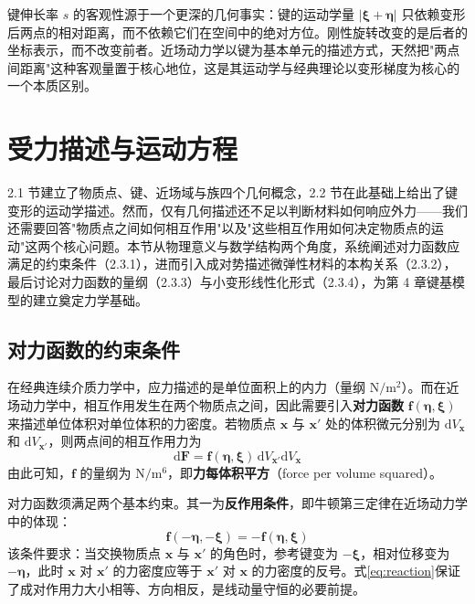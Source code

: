 \begin{remark}
  键伸长率 $s$ 的客观性源于一个更深的几何事实：键的运动学量 $|\boldsymbol{\xi}+\boldsymbol{\eta}|$ 只依赖变形后两点的相对距离，而不依赖它们在空间中的绝对方位。刚性旋转改变的是后者的坐标表示，而不改变前者。近场动力学以键为基本单元的描述方式，天然把"两点间距离"这种客观量置于核心地位，这是其运动学与经典理论以变形梯度为核心的一个本质区别。
\end{remark}

\section{受力描述与运动方程}

2.1 节建立了物质点、键、近场域与族四个几何概念，2.2 节在此基础上给出了键变形的运动学描述。然而，仅有几何描述还不足以判断材料如何响应外力——我们还需要回答"物质点之间如何相互作用"以及"这些相互作用如何决定物质点的运动"这两个核心问题。本节从物理意义与数学结构两个角度，系统阐述对力函数应满足的约束条件（2.3.1），进而引入成对势描述微弹性材料的本构关系（2.3.2），最后讨论对力函数的量纲（2.3.3）与小变形线性化形式（2.3.4），为第 4 章键基模型的建立奠定力学基础。

\subsection{对力函数的约束条件}

在经典连续介质力学中，应力描述的是单位面积上的内力（量纲 $\mathrm{N}/\mathrm{m}^{2}$）。而在近场动力学中，相互作用发生在两个物质点之间，因此需要引入\textbf{对力函数} $\mathbf{f}(\boldsymbol{\eta},\boldsymbol{\xi})$ 来描述单位体积对单位体积的力密度。若物质点 $\mathbf{x}$ 与 $\mathbf{x}'$ 处的体积微元分别为 $\mathrm{d}V_{\mathbf{x}}$ 和 $\mathrm{d}V_{\mathbf{x}'}$，则两点间的相互作用力为
\begin{equation}
  \mathrm{d}\mathbf{F}=\mathbf{f}(\boldsymbol{\eta},\boldsymbol{\xi})\,\mathrm{d}V_{\mathbf{x}'}\mathrm{d}V_{\mathbf{x}}
  \label{eq:pairwise-force-def}
\end{equation}
由此可知，$\mathbf{f}$ 的量纲为 $\mathrm{N}/\mathrm{m}^{6}$，即\textbf{力每体积平方}（force per volume squared）。

对力函数须满足两个基本约束。其一为\textbf{反作用条件}，即牛顿第三定律在近场动力学中的体现：
\begin{equation}
  \mathbf{f}(-\boldsymbol{\eta},-\boldsymbol{\xi})=-\mathbf{f}(\boldsymbol{\eta},\boldsymbol{\xi})
\end{equation}
该条件要求：当交换物质点 $\mathbf{x}$ 与 $\mathbf{x}'$ 的角色时，参考键变为 $-\boldsymbol{\xi}$，相对位移变为 $-\boldsymbol{\eta}$，此时 $\mathbf{x}$ 对 $\mathbf{x}'$ 的力密度应等于 $\mathbf{x}'$ 对 $\mathbf{x}$ 的力密度的反号。式\eqref{eq:reaction}保证了成对作用力大小相等、方向相反，是线动量守恒的必要前提。

